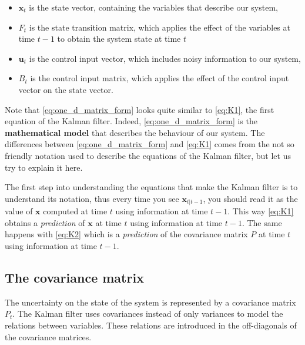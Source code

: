 \documentclass[12pt,a4paper,final]{article} %
\newcommand{\vect}[1]{\mathbf{#1}}
\begin{document}
\begin{itemize}
\item $\vect{x}_t$ is the state vector, containing the variables that
  describe our system,\\
\item $F_t$ is the state transition matrix, which applies the effect
  of the variables at time $t-1$ to obtain the system state at time $t$\\
\item $\vect{u}_t$ is the control input vector, which includes noisy
  information to our system,
\item $B_t$ is the control input matrix, which applies the effect of
  the control input vector on the state vector.\\
\end{itemize}

Note that \eqref{eq:one_d_matrix_form} looks quite similar to
\eqref{eq:K1}, the first equation of the Kalman filter. Indeed,
\eqref{eq:one_d_matrix_form} is the \textbf{mathematical model} that
describes the behaviour of our system. The differences between
\eqref{eq:one_d_matrix_form} and \eqref{eq:K1} comes from the not so
friendly notation used to describe the equations of the Kalman filter,
but let us try to explain it here.

The first step into understanding the equations that make the Kalman
filter is to understand its notation, thus every time you see
$\vect{x}_{t|t-1}$, you should read it as the value of $\vect{x}$
computed at time $t$ using information at time $t-1$. This way
\eqref{eq:K1} obtains a \textit{prediction} of $\vect{x}$ at time $t$
using information at time $t-1$. The same happens with \eqref{eq:K2}
which is a \textit{prediction} of the covariance matrix $P$ at time
$t$ using information at time $t-1$.

\subsection{The covariance matrix}
The uncertainty on the state of the system is represented by a
covariance matrix $P_t$. The Kalman filter uses covariances instead of
only variances to model the relations between variables. These
relations are introduced in the off-diagonals of the covariance
matrices.
\end{document}

